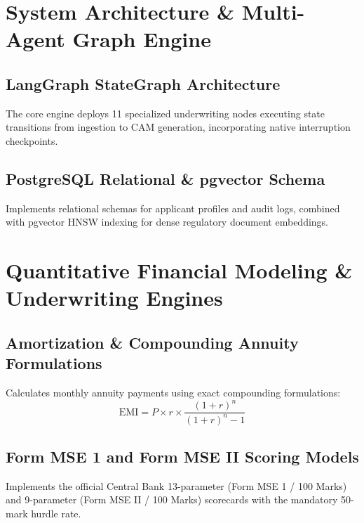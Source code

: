 \documentclass[11pt,a4paper,oneside]{report}
\begin{document}
\chapter{System Architecture \& Multi-Agent Graph Engine}

\section{LangGraph StateGraph Architecture}
The core engine deploys 11 specialized underwriting nodes executing state transitions from ingestion to CAM generation, incorporating native interruption checkpoints.

\section{PostgreSQL Relational \& pgvector Schema}
Implements relational schemas for applicant profiles and audit logs, combined with pgvector HNSW indexing for dense regulatory document embeddings.

\chapter{Quantitative Financial Modeling \& Underwriting Engines}

\section{Amortization \& Compounding Annuity Formulations}
Calculates monthly annuity payments using exact compounding formulations:
\begin{equation}
\text{EMI} = P \times r \times \frac{(1+r)^n}{(1+r)^n - 1}
\end{equation}

\section{Form MSE 1 and Form MSE II Scoring Models}
Implements the official Central Bank 13-parameter (Form MSE 1 / 100 Marks) and 9-parameter (Form MSE II / 100 Marks) scorecards with the mandatory 50-mark hurdle rate.
\end{document}
